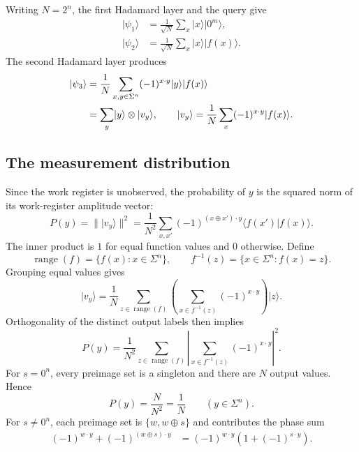 \documentclass[11pt,oneside,openany]{book}
\providecommand{\ket}{}
\renewcommand{\ket}[1]{\lvert #1\rangle}
\providecommand{\braket}{}
\renewcommand{\braket}[2]{\langle #1\vert #2\rangle}
\theoremstyle{definition}
\begin{document}
\par
Writing $N=2^n$, the first Hadamard layer and the query give
\begin{align}
 \ket{\psi_1}&=\frac1{\sqrt N}\sum_x\ket x\ket{0^m},\\
 \ket{\psi_2}&=\frac1{\sqrt N}\sum_x\ket x\ket{f(x)}.
 \label{eq:simon-post-oracle}
\end{align}
The second Hadamard layer produces
\begin{align}
 \ket{\psi_3}
 &=\frac1N\sum_{x,y\in\Sigma^n}(-1)^{x\cdot y}\ket y\ket{f(x)}\notag\\
 &=\sum_y\ket y\otimes\ket{v_y},\qquad
 \ket{v_y}=\frac1N\sum_x(-1)^{x\cdot y}\ket{f(x)}.
 \label{eq:simon-final-state}
\end{align}

\subsection{The measurement distribution}
Since the work register is unobserved, the probability of $y$ is the squared norm of its work-register amplitude vector:
\begin{equation}
 P(y)=\|\ket{v_y}\|^2
 =\frac1{N^2}\sum_{x,x'}(-1)^{(x\oplus x')\cdot y}\braket{f(x')}{f(x)}.
 \label{eq:simon-prob-double}
\end{equation}
The inner product is $1$ for equal function values and $0$ otherwise. Define
\begin{equation}
 \operatorname{range}(f)=\{f(x):x\in\Sigma^n\},\qquad
 f^{-1}(z)=\{x\in\Sigma^n:f(x)=z\}.
\end{equation}
Grouping equal values gives
\begin{equation}
 \ket{v_y}=\frac1N\sum_{z\in\operatorname{range}(f)}
 \left(\sum_{x\in f^{-1}(z)}(-1)^{x\cdot y}\right)\ket z.
\end{equation}
Orthogonality of the distinct output labels then implies
\begin{equation}
 P(y)=\frac1{N^2}\sum_{z\in\operatorname{range}(f)}
 \left|\sum_{x\in f^{-1}(z)}(-1)^{x\cdot y}\right|^2.
 \label{eq:simon-fiber-prob}
\end{equation}
For $s=0^n$, every preimage set is a singleton and there are $N$ output values. Hence
\begin{equation}
 P(y)=\frac N{N^2}=\frac1N\qquad(y\in\Sigma^n).
 \label{eq:simon-injective-prob}
\end{equation}
For $s\ne0^n$, each preimage set is $\{w,w\oplus s\}$ and contributes the phase sum
\begin{align}
 (-1)^{w\cdot y}+(-1)^{(w\oplus s)\cdot y}
 &=(-1)^{w\cdot y}\left(1+(-1)^{s\cdot y}\right).
\end{align}
\end{document}
